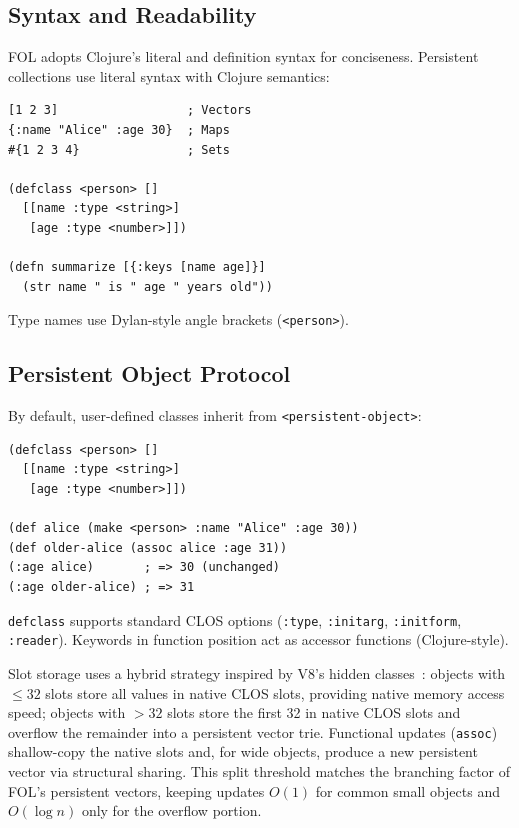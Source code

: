 \documentclass[sigconf,nonacm,review]{acmart}
\begin{document}
\subsection{Syntax and Readability}

FOL adopts Clojure's literal and definition syntax for conciseness. Persistent collections use literal syntax with Clojure semantics:

\begin{lstlisting}
[1 2 3]                  ; Vectors
{:name "Alice" :age 30}  ; Maps
#{1 2 3 4}               ; Sets

(defclass <person> []
  [[name :type <string>]
   [age :type <number>]])

(defn summarize [{:keys [name age]}]
  (str name " is " age " years old"))
\end{lstlisting}

Type names use Dylan-style angle brackets (\texttt{<person>}).

\subsection{Persistent Object Protocol}

By default, user-defined classes inherit from \texttt{<persistent-object>}:

\begin{lstlisting}
(defclass <person> []
  [[name :type <string>]
   [age :type <number>]])

(def alice (make <person> :name "Alice" :age 30))
(def older-alice (assoc alice :age 31))
(:age alice)       ; => 30 (unchanged)
(:age older-alice) ; => 31
\end{lstlisting}

\texttt{defclass} supports standard CLOS options (\texttt{:type}, \texttt{:initarg}, \texttt{:initform}, \texttt{:reader}). Keywords in function position act as accessor functions (Clojure-style).

Slot storage uses a hybrid strategy inspired by V8's hidden classes~\cite{Bruni2017}: objects with $\le 32$ slots store all values in native CLOS slots, providing native memory access speed; objects with $> 32$ slots store the first 32 in native CLOS slots and overflow the remainder into a persistent vector trie. Functional updates (\texttt{assoc}) shallow-copy the native slots and, for wide objects, produce a new persistent vector via structural sharing. This split threshold matches the branching factor of FOL's persistent vectors, keeping updates $O(1)$ for common small objects and $O(\log n)$ only for the overflow portion.
\end{document}
